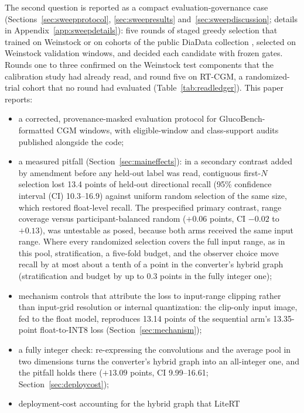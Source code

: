 \documentclass[10pt,twocolumn]{article}
\begin{document}
The second question is reported as a compact evaluation-governance case
(Sections~\ref{sec:sweepprotocol}, \ref{sec:sweepresults}
and~\ref{sec:sweepdiscussion}; details in Appendix~\ref{app:sweepdetails}):
five rounds of staged greedy selection that trained on Weinstock or on
cohorts of the public DiaData collection \cite{cinar2026diadata}, selected
on Weinstock validation windows, and decided each candidate with frozen
gates. Rounds one to three confirmed on the Weinstock test components that
the calibration study had already read, and round five on RT-CGM, a
randomized-trial cohort that no round had evaluated
(Table~\ref{tab:readledger}). This paper reports:
\begin{itemize}
    \item a corrected, provenance-masked evaluation protocol for
    GlucoBench-formatted CGM windows, with eligible-window and class-support
    audits published alongside the code;
    \item a measured pitfall (Section~\ref{sec:maineffects}): in a
    secondary contrast added by amendment before any held-out label was
    read, contiguous first-$N$ selection lost 13.4 points of held-out
    directional recall (95\% confidence interval (CI) 10.3--16.9) against
    uniform random selection of the same size, which restored float-level
    recall. The prespecified primary contrast, range coverage versus
    participant-balanced random ($+0.06$ points, CI $-0.02$ to $+0.13$),
    was untestable as posed, because both arms received the same input
    range. Where every randomized selection covers the full input range,
    as in this pool, stratification, a five-fold budget, and the observer
    choice move recall by at most about a tenth of a point in the
    converter's hybrid graph (stratification and budget by up to 0.3
    points in the fully integer one);
    \item mechanism controls that attribute the loss to input-range
    clipping rather than input-grid resolution or internal quantization:
    the clip-only input image, fed to the float model, reproduces 13.14
    points of the sequential arm's 13.35-point float-to-INT8 loss
    (Section~\ref{sec:mechanism});
    \item a fully integer check: re-expressing the convolutions and the
    average pool in two dimensions turns the converter's hybrid graph into
    an all-integer one,
    and the pitfall holds there ($+13.09$ points, CI 9.99--16.61;
    Section~\ref{sec:deploycost});
    \item deployment-cost accounting for the hybrid graph that LiteRT

\end{itemize}
\end{document}
